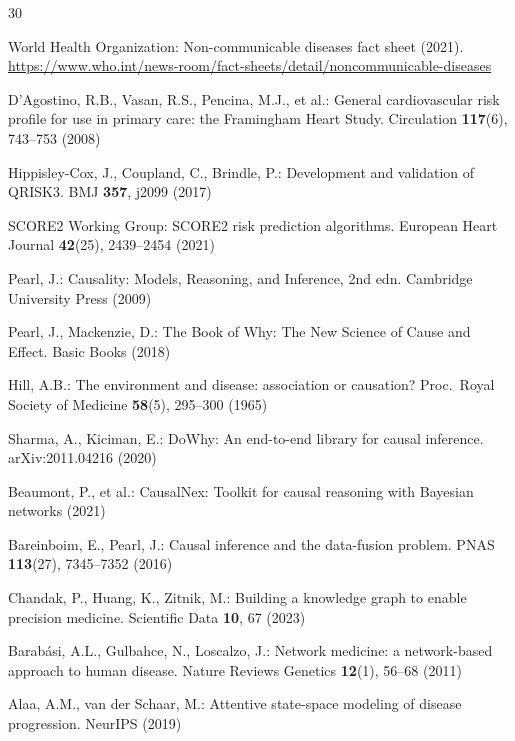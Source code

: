 \documentclass[runningheads]{llncs}
\begin{document}
\begin{thebibliography}{30}

World Health Organization:
Non-communicable diseases fact sheet (2021).
\url{https://www.who.int/news-room/fact-sheets/detail/noncommunicable-diseases}

D'Agostino, R.B., Vasan, R.S., Pencina, M.J., et al.:
General cardiovascular risk profile for use in primary care:
the Framingham Heart Study.
Circulation \textbf{117}(6), 743--753 (2008)

Hippisley-Cox, J., Coupland, C., Brindle, P.:
Development and validation of QRISK3.
BMJ \textbf{357}, j2099 (2017)

SCORE2 Working Group:
SCORE2 risk prediction algorithms.
European Heart Journal \textbf{42}(25), 2439--2454 (2021)

Pearl, J.:
Causality: Models, Reasoning, and Inference, 2nd edn.
Cambridge University Press (2009)

Pearl, J., Mackenzie, D.:
The Book of Why: The New Science of Cause and Effect.
Basic Books (2018)

Hill, A.B.:
The environment and disease: association or causation?
Proc.\ Royal Society of Medicine \textbf{58}(5), 295--300 (1965)

Sharma, A., Kiciman, E.:
DoWhy: An end-to-end library for causal inference.
arXiv:2011.04216 (2020)

Beaumont, P., et al.:
CausalNex: Toolkit for causal reasoning with Bayesian networks (2021)

Bareinboim, E., Pearl, J.:
Causal inference and the data-fusion problem.
PNAS \textbf{113}(27), 7345--7352 (2016)

Chandak, P., Huang, K., Zitnik, M.:
Building a knowledge graph to enable precision medicine.
Scientific Data \textbf{10}, 67 (2023)

Barab\'{a}si, A.L., Gulbahce, N., Loscalzo, J.:
Network medicine: a network-based approach to human disease.
Nature Reviews Genetics \textbf{12}(1), 56--68 (2011)

Alaa, A.M., van der Schaar, M.:
Attentive state-space modeling of disease progression.
NeurIPS (2019)


\end{thebibliography}
\end{document}
